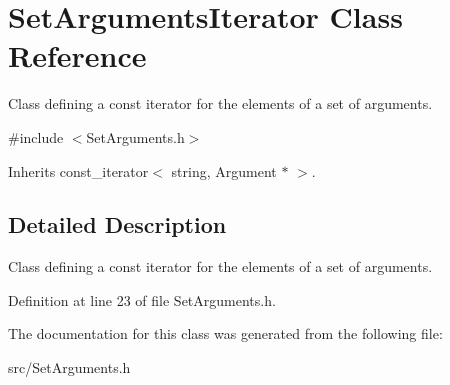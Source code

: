 \hypertarget{classSetArgumentsIterator}{\section{Set\-Arguments\-Iterator Class Reference}
\label{classSetArgumentsIterator}
}


Class defining a const iterator for the elements of a set of arguments.  




{\ttfamily \#include $<$Set\-Arguments.\-h$>$}



Inherits const\-\_\-iterator$<$ string, Argument $\ast$ $>$.



\subsection{Detailed Description}
Class defining a const iterator for the elements of a set of arguments. 

Definition at line 23 of file Set\-Arguments.\-h.



The documentation for this class was generated from the following file\-:\begin{DoxyCompactItemize}
\item 
src/Set\-Arguments.\-h\end{DoxyCompactItemize}
